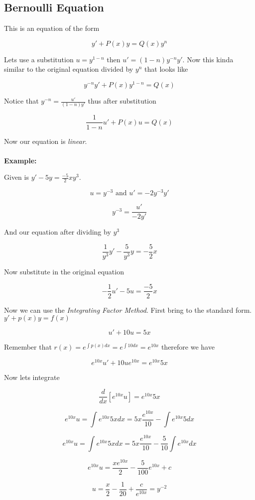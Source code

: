 \subsection{Bernoulli Equation}

This is an equation of the form 

\[
y' + P(x)y = Q(x)y^n
\]

Lets use a substitution \(u = y^{1 - n}\) then \(u' = (1 - n)y^{-n} y'\). Now this kinda similar to the original equation
divided by \(y^n\) that looks like

\[
y^{-n}y' + P(x)y^{1 -n} = Q(x)
\]

Notice that \(y^{-n} = \frac{u'}{(1-n)y'}\) thus after substitution

\[
\frac{1}{1 - n}u' + P(x)u = Q(x)
\]

Now our equation is \emph{linear}.
\\\\
\textbf{Example: }

Given is \(y' -5y = \frac{-5}{2}xy^3\).

\[
u = y^{-3}  \text{ and } u' = -2y^{-3}y'
\]

\[
y^{-3} = \frac{u'}{-2y'}
\]

And our equation after dividing by \(y^{3}\)

\[
\frac{1}{y^3}y' - \frac{5}{y^3}y = -\frac{5}{2}x 
\]

Now substitute in the original equation

\[
- \frac{1}{2} u' - 5u = \frac{-5}{2}x
\]

Now we can use the \emph{Integrating Factor Method}. First bring to the standard form.
\(y' + p(x)y = f(x)\)

\[
  u' + 10u = 5x 
\]

Remember that \(r(x) = e^{\int p(x)dx} = e^{\int 10 dx} = e^{10x}\) therefore we have

\[
e^{10x}u' + 10ue^{10x} = e^{10x}5x
\]

Now lets integrate

\[
\frac{d}{dx} \left[e^{10x}u\right] = e^{10x}5x
\]

\[
e^{10x}u = \int e^{10x} 5x dx = 5x \frac{e^{10x}}{10} - \int e^{10x}5dx
\]

\[
e^{10x}u = \int e^{10x} 5x dx = 5x \frac{e^{10x}}{10} - \frac{5}{10}\int e^{10x}dx
\]

\[
e^{10x}u = \frac{xe^{10x}}{2} - \frac{5}{100} e^{10x} + c
\]

\[
u = \frac{x}{2} - \frac{1}{20} + \frac{c}{e^{10x}} = y^{-2}
\]


